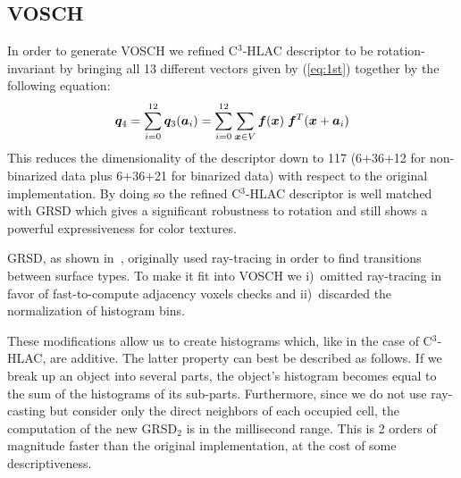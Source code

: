 \documentclass[a4paper, 10 pt, conference]{sty/ieeeconf}
\begin{document}
\subsection{VOSCH}
\label{sec:VOSCH}
In order to generate VOSCH we refined C$^3$-HLAC descriptor to be rotation-invariant by bringing all  
13 different vectors given by (\ref{eq:1st}) together by the following equation: 
\begin{equation}\label{eq:1st_new}
  {\bm q_4} = \sum_{i=0}^{12} {\bm q_3}({\bm a}_i) = \sum_{i=0}^{12}\sum_{{\bm x} \in V} \bm{f}({\bm x}) \hspace{1mm}\bm{f}^T({\bm x}+{\bm a_i}) \\
\end{equation}
%
This reduces the dimensionality of the descriptor down to 117 (6+36+12 for non-binarized data plus 6+36+21 
for binarized data) with respect to the original implementation. 
By doing so the refined C$^3$-HLAC descriptor is well matched with GRSD which gives a significant 
robustness to rotation and still shows a powerful expressiveness for color textures.

GRSD, as shown in~\cite{GRSD10Humanoids}, originally used
ray-tracing in order to find transitions between surface types. To make it fit into VOSCH 
we i)~omitted ray-tracing in favor of fast-to-compute adjacency voxels checks and ii)~discarded
the normalization of histogram bins.

These modifications allow us to create histograms which, like in the case of C$^3$-HLAC, are additive.
The latter property can best be described as follows. 
If we break up an object into several parts, 
the object's histogram becomes equal to the sum of the histograms of its sub-parts. 
%
%
 Furthermore, since we do not use ray-casting but 
consider only the direct neighbors of each occupied cell, the computation of the new GRSD$_2$ is in 
the millisecond range. This is 2 orders of magnitude faster than the original implementation,
at the cost of some descriptiveness.
\end{document}
